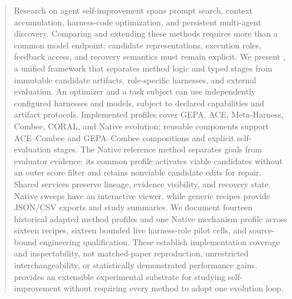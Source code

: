 \begin{abstract}
Research on agent self-improvement spans prompt search, context accumulation, harness-code optimization, and persistent multi-agent discovery. Comparing and extending these methods requires more than a common model endpoint: candidate representations, execution roles, feedback access, and recovery semantics must remain explicit. We present \proteus{}, a unified framework that separates method logic and typed stages from immutable candidate artifacts, role-specific harnesses, and external evaluation. An optimizer and a task subject can use independently configured harnesses and models, subject to declared capabilities and artifact protocols. Implemented profiles cover GEPA, ACE, Meta-Harness, Combee, CORAL, and Native evolution; reusable components support ACE--Combee and GEPA--Combee compositions and explicit self-evaluation stages. The Native reference method separates goals from evaluator evidence; its common profile activates viable candidates without an outer score filter and retains nonviable candidate edits for repair. Shared services preserve lineage, evidence visibility, and recovery state. Native sweeps have an interactive viewer, while generic recipes provide JSON/CSV exports and study summaries. We document fourteen historical adapted method profiles and one Native mechanism profile across sixteen recipes, sixteen bounded live harness-role pilot cells, and source-bound engineering qualification. These establish implementation coverage and inspectability, not matched-paper reproduction, unrestricted interchangeability, or statistically demonstrated performance gains. \proteus{} provides an extensible experimental substrate for studying self-improvement without requiring every method to adopt one evolution loop.
\end{abstract}
